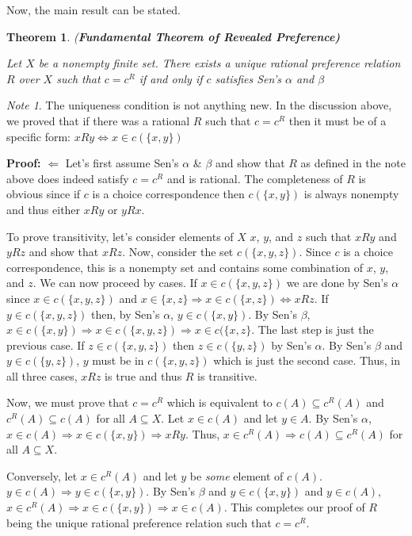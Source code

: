 \documentclass[12pt]{article}
\theoremstyle{plain}
\newtheorem{thm}{Theorem}
\theoremstyle{definition}
\theoremstyle{remark}
\newtheorem*{note}{Note}
\newcommand{\tn}[1]{\textnormal{#1}}
\newcommand{\3}{\vspace*{3mm}}
\newcommand{\name}[1]{\tn{(\textbf{#1)}}}
\newcommand{\RIGHT}{\Longrightarrow}
\newcommand{\LEFT}{\Longleftarrow}
\newcommand{\IFF}{\Longleftrightarrow}
\newcommand{\Proof}{\textbf{Proof:} \hspace*{0.25mm}}
\begin{document}
Now, the main result can be stated.

\begin{thm} \name{Fundamental Theorem of Revealed Preference}

Let $X$ be a nonempty finite set. There exists a unique rational preference relation $R$ over $X$ such that $c = c^R$ if and only if $c$ satisfies Sen's $\alpha$ and $\beta$

\end{thm}

\begin{note}
The uniqueness condition is not anything new. In the discussion above, we proved that if there was a rational $R$ such that $c = c^R$ then it must be of a specific form: $x R y \IFF x \in c(\{x,y\})$

\end{note}

\Proof $\LEFT$ Let's first assume Sen's $\alpha$ \& $\beta$ and show that $R$ as defined in the note above does indeed satisfy $c = c^R$ and is rational. The completeness of $R$ is obvious since if $c$ is a choice correspondence then $c(\{x,y\})$ is always nonempty and thus either $x R y$ or $y R x$. 


To prove transitivity, let's consider elements of $X$ $x$, $y$, and $z$ such that $x R y$ and $y R z$ and show that $x R z$. Now, consider the set $c(\{x,y,z\})$. Since $c$ is a choice correspondence, this is a nonempty set and contains some combination of $x$, $y$, and $z$. We can now proceed by cases. If $x \in c(\{x,y,z\})$ we are done by Sen's $\alpha$ since $x \in c(\{x,y,z\})$ and $x \in \{x,z\} \RIGHT x \in c(\{x,z\}) \IFF x R z$. If $y \in c(\{x,y,z\})$ then, by Sen's $\alpha$, $y \in c(\{x,y\})$. By Sen's $\beta$, $x \in c(\{x,y\}) \RIGHT x \in c(\{x,y,z\}) \RIGHT x \in c(\{x,z\}$. The last step is just the previous case. If $z \in c(\{x,y,z\})$ then $z \in c(\{y,z\}) $ by Sen's $\alpha$. By Sen's $\beta$ and $y \in c(\{y,z\})$, $y$ must be in $c(\{x,y,z\})$ which is just the second case. Thus, in all three cases, $x R z$ is true and thus $R$ is transitive. 


Now, we must prove that $c = c^R$ which is equivalent to $c(A) \subseteq c^R(A)$ and $c^R(A) \subseteq c(A)$ for all $A \subseteq X$. Let $x \in c(A)$ and let $y \in A$. By Sen's $\alpha$, $x \in c(A) \RIGHT x \in c(\{x,y\}) \RIGHT x R y$. Thus, $x \in c^R(A) \RIGHT c(A) \subseteq c^R(A)$ for all $A \subseteq X$. 

Conversely, let $x \in c^R(A)$ and let $y$ be \emph{some} element of $c(A)$. $y \in c(A) \RIGHT y \in c(\{x,y\})$. By Sen's $\beta$ and $y \in c(\{x,y\})$ and $y \in c(A)$, $x \in c^R(A) \RIGHT x \in c(\{x,y\}) \RIGHT x \in c(A) $. This completes our proof of $R$ being the unique rational preference relation such that $c = c^R$.
\end{document}
